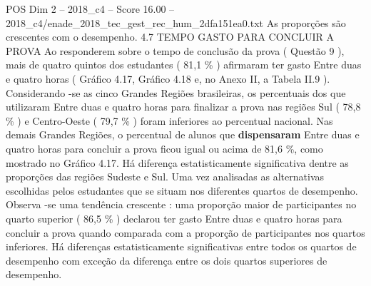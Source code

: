 \begin{textsample}{POS Dim 2 – 2018\_c4 – Score 16.00 – 2018\_c4/enade\_2018\_tec\_gest\_rec\_hum\_2dfa151ea0.txt}
As proporções são crescentes com o desempenho. 4.7 TEMPO GASTO PARA CONCLUIR A PROVA Ao responderem sobre o tempo de conclusão da prova ( Questão 9 ), mais de quatro quintos dos estudantes ( 81,1 \% ) afirmaram ter gasto Entre duas e quatro horas ( Gráfico 4.17, Gráfico 4.18 e, no Anexo II, a Tabela II.9 ).
Considerando -se as cinco Grandes Regiões brasileiras, os percentuais dos que utilizaram Entre duas e quatro horas para finalizar a prova nas regiões Sul ( 78,8 \% ) e Centro-Oeste ( 79,7 \% ) foram inferiores ao percentual nacional.
Nas demais Grandes Regiões, o percentual de alunos que \textbf{dispensaram} Entre duas e quatro horas para concluir a prova ficou igual ou acima de 81,6 \%, como mostrado no Gráfico 4.17.
Há diferença estatisticamente significativa dentre as proporções das regiões Sudeste e Sul.
Uma vez analisadas as alternativas escolhidas pelos estudantes que se situam nos diferentes quartos de desempenho.
Observa -se uma tendência crescente : uma proporção maior de participantes no quarto superior ( 86,5 \% ) declarou ter gasto Entre duas e quatro horas para concluir a prova quando comparada com a proporção de participantes nos quartos inferiores.
Há diferenças estatisticamente significativas entre todos os quartos de desempenho com exceção da diferença entre os dois quartos superiores de desempenho.

\end{textsample}
